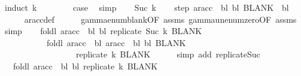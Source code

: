 \begin{isabellebody}
%
\isadelimproof
%
\endisadelimproof
%
\isatagproof
{}\isamarkupfalse%
\ {\isacharparenleft}{\kern0pt}induct\ k{\isacharparenright}{\kern0pt}\isanewline
\ \ \isamarkupfalse%
\ {}\isanewline
\ \ \isamarkupfalse%
\ {\isacharquery}{\kern0pt}case\ \isamarkupfalse%
\ simp\isanewline
{}\isamarkupfalse%
\isanewline
\ \ \isamarkupfalse%
\ {\isacharparenleft}{\kern0pt}Suc\ k{\isacharparenright}{\kern0pt}\isanewline
\ \ \isamarkupfalse%
\ step{\isacharcolon}{\kern0pt}\ {\isachardoublequoteopen}ar{\isacharunderscore}{\kern0pt}acc\ {\isasymGamma}\ bl\ bl\ BLANK{}\ {\isacharequal}{\kern0pt}\ bl{\isachardoublequoteclose}\isanewline
\ \ \ \ \isamarkupfalse%
\ ar{\isacharunderscore}{\kern0pt}acc{\isacharunderscore}{\kern0pt}def\isanewline
\ \ \ \ \isamarkupfalse%
\ gamma{\isacharunderscore}{\kern0pt}enum{\isacharunderscore}{\kern0pt}blank{\isacharbrackleft}{\kern0pt}OF\ assms{\isacharparenleft}{\kern0pt}{}{\isacharparenright}{\kern0pt}{\isacharbrackright}{\kern0pt}\ gamma{\isacharunderscore}{\kern0pt}unenum{\isacharunderscore}{\kern0pt}zero{\isacharbrackleft}{\kern0pt}OF\ assms{\isacharbrackright}{\kern0pt}\ \isamarkupfalse%
\ simp\isanewline
\ \ \isamarkupfalse%
\ {\isachardoublequoteopen}foldl\ {\isacharparenleft}{\kern0pt}ar{\isacharunderscore}{\kern0pt}acc\ {\isasymGamma}\ bl{\isacharparenright}{\kern0pt}\ bl\ {\isacharparenleft}{\kern0pt}replicate\ {\isacharparenleft}{\kern0pt}Suc\ k{\isacharparenright}{\kern0pt}\ BLANK{}{\isacharparenright}{\kern0pt}\isanewline
\ \ \ \ \ \ \ \ \ \ {\isacharequal}{\kern0pt}\ foldl\ {\isacharparenleft}{\kern0pt}ar{\isacharunderscore}{\kern0pt}acc\ {\isasymGamma}\ bl{\isacharparenright}{\kern0pt}\ {\isacharparenleft}{\kern0pt}ar{\isacharunderscore}{\kern0pt}acc\ {\isasymGamma}\ bl\ bl\ BLANK{}{\isacharparenright}{\kern0pt}\isanewline
\ \ \ \ \ \ \ \ \ \ \ \ \ \ \ \ \ \ {\isacharparenleft}{\kern0pt}replicate\ k\ BLANK{}{\isacharparenright}{\kern0pt}{\isachardoublequoteclose}\isanewline
\ \ \ \ \isamarkupfalse%
\ {\isacharparenleft}{\kern0pt}simp\ add{\isacharcolon}{\kern0pt}\ replicate{\isacharunderscore}{\kern0pt}Suc{\isacharparenright}{\kern0pt}\isanewline
\ \ \isamarkupfalse%
\ \isamarkupfalse%
\ {\isachardoublequoteopen}{\isasymdots}\ {\isacharequal}{\kern0pt}\ foldl\ {\isacharparenleft}{\kern0pt}ar{\isacharunderscore}{\kern0pt}acc\ {\isasymGamma}\ bl{\isacharparenright}{\kern0pt}\ bl\ {\isacharparenleft}{\kern0pt}replicate\ k\ BLANK{}{\isacharparenright}{\kern0pt}{\isachardoublequoteclose}\isanewline

\end{isabellebody}
